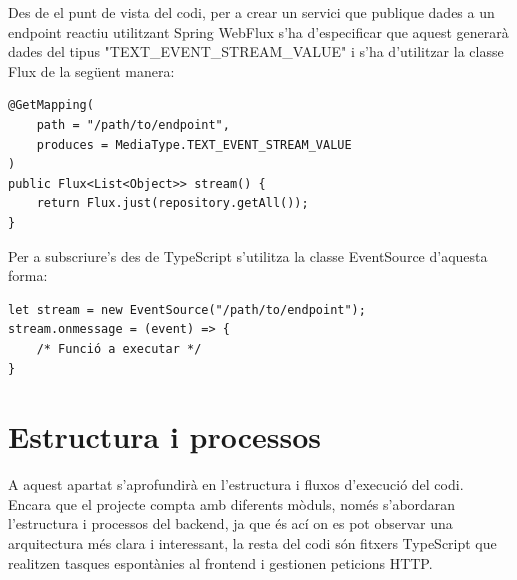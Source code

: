 \noindent
Des de el punt de vista del codi, per a crear un servici que publique dades a un endpoint reactiu utilitzant Spring
WebFlux s'ha d'especificar que aquest generarà dades del tipus "TEXT\_EVENT\_STREAM\_VALUE" i s'ha d'utilitzar la classe Flux de la següent manera:
\begin{verbatim}
@GetMapping(
    path = "/path/to/endpoint",
    produces = MediaType.TEXT_EVENT_STREAM_VALUE
)
public Flux<List<Object>> stream() {
    return Flux.just(repository.getAll());
}
\end{verbatim}
Per a subscriure's des de TypeScript s'utilitza la classe EventSource d'aquesta forma:
\begin{verbatim}
let stream = new EventSource("/path/to/endpoint");
stream.onmessage = (event) => {
    /* Funció a executar */
}
\end{verbatim}
\section{Estructura i processos}
A aquest apartat s'aprofundirà en l'estructura i fluxos d'execució del codi.
\\[3mm]
Encara que el projecte compta amb diferents mòduls, només s'abordaran l'estructura i processos del backend, ja que és ací on es pot observar una arquitectura més clara i interessant, la resta del codi són fitxers TypeScript que realitzen tasques espontànies al frontend i gestionen peticions HTTP.
